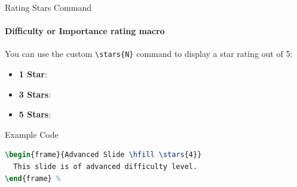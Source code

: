 \begin{frame}[fragile]{Rating Stars Command}
\framesubtitle{Difficulty or Importance rating macro}
You can use the custom \verb|\stars{N}| command to display a star rating out of 5:
\begin{itemize}
    \item \textbf{1 Star}: 
    \item \textbf{3 Stars}: 
    \item \textbf{5 Stars}: 
\end{itemize}

\begin{block}{Example Code}
\begin{lstlisting}[language=TeX]
\begin{frame}{Advanced Slide \hfill \stars{4}}
  This slide is of advanced difficulty level.
\end{frame} %
\end{lstlisting}
\end{block}
\end{frame}
